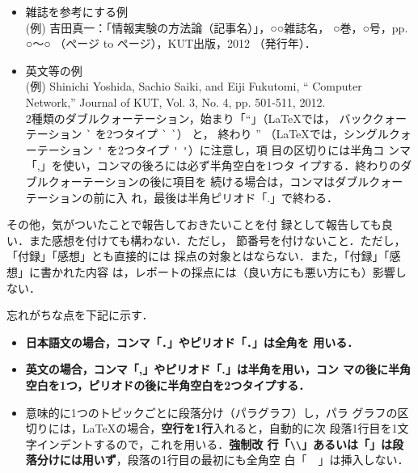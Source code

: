 \begin{description}
\begin{itemize}
	    (例) 佐伯サチオ，福冨エイジ著，福本昌弘監修，吉田真一訳：
	    「情報実験の方法論」，pp. ○〜○ （どのぺージに書いてあるか），
	    KUT出版，2012（発行年）．

	     \item 雑誌を参考にする例\\

	    (例) 吉田真一：「情報実験の方法論（記事名）」，○○雑誌名，
	    ○巻，○号，pp. ○〜○ （ぺージ to ページ），KUT出版，2012 
	    （発行年）．

	     \item 英文等の例\\

	    (例) Shinichi Yoshida, Sachio Saiki, and Eiji Fukutomi, ``
		   Computer Network,'' Journal of KUT, Vol. 3, No. 4,
		   pp. 501-511, 2012.\\

		   2種類のダブルクォーテーション，始まり「``」（LaTeXでは，
		   バッククォーテーション \verb|`| を2つタイプ \verb|`| \verb|`|） と，
		   終わり '' （LaTeXでは，シングルクォーテーション
		   \verb|'| を2つタイプ \verb|'| \verb|'|）に注意し，項
		   目の区切りには半角コ
		   ンマ「,」を使い，コンマの後ろには必ず半角空白を1つタ
		   イプする．終わりのダブルクォーテーションの後に項目を
		   続ける場合は，コンマはダブルクォーテーションの前に入
		   れ，最後は半角ピリオド「.」で終わる．


	    \end{itemize}

 \item[（付録や感想）] その他，気がついたことで報告しておきたいことを付
	    録として報告しても良い．また感想を付けても構わない．ただし，
	    節番号を付けないこと．ただし，「付録」「感想」とも直接的には
	    採点の対象とはならない．また，「付録」「感想」に書かれた内容
	    は，レポートの採点には（良い方にも悪い方にも）影響しない．

\end{description}

忘れがちな点を下記に示す．
\begin{itemize}
 \item {\bf 日本語文の場合，コンマ「．」やピリオド「．」は全角を
		   用いる．}
 \item {\bf 英文の場合，コンマ「,」やピリオド「.」は半角を用い，コン
       マの後に半角空白を1つ，ピリオドの後に半角空白を2つタイプする．}
 \item 意味的に1つのトピックごとに段落分け（パラグラフ）し，パラ
       グラフの区切りには，\LaTeX の場合，{\bf 空行を1行}入れると，自動的に次
       段落1行目を1文字インデントするので，これを用いる．{\bf 強制改
       行「\verb|\|\verb|\|」あるいは「\bf \yen\yen」は段落分けには用いず}，段落の1行目の最初にも全角空
       白「　」は挿入しない．
\end{itemize}


